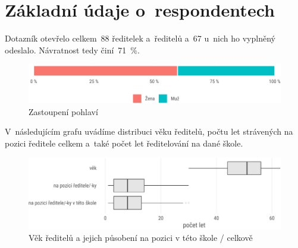 \documentclass[12pt,a4paper,]{report}
\begin{document}
\hypertarget{zuxe1kladnuxed-uxfadaje-o-respondentech}{%
\chapter{\texorpdfstring{Základní údaje o~respondentech}{Základní údaje orespondentech}}\label{zuxe1kladnuxed-uxfadaje-o-respondentech}}

Dotazník otevřelo celkem~88 ředitelek a~ředitelů a~67 u~nich ho vyplněný odeslalo. Návratnost tedy činí~71~\%.

\begin{figure}

{\centering \includegraphics[width=\textwidth]{figs/sex-1} 

}

\caption{Zastoupení pohlaví}\label{fig:sex}
\end{figure}

V~následujícím grafu uvádíme distribuci věku ředitelů, počtu let strávených na pozici ředitele celkem a~také počet let ředitelování na dané škole.

\begin{figure}

{\centering \includegraphics[width=\textwidth]{figs/age-1} 

}

\caption{Věk ředitelů a jejich působení na pozici v této škole / celkově}\label{fig:age}
\end{figure}
\end{document}
